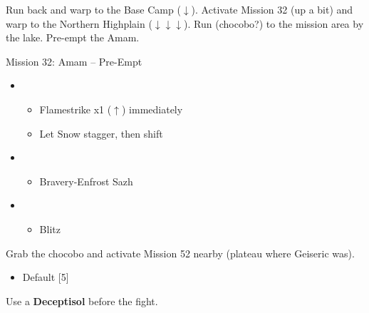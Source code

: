 Run back and warp to the Base Camp ($\downarrow$).
Activate Mission 32 (up a bit) and warp to the Northern Highplain ($\downarrow\downarrow\downarrow$).
Run (chocobo?) to the mission area by the lake.
Pre-empt the Amam.

\begin{battle}{Mission 32: Amam -- Pre-Empt}
	\begin{itemize}
		\item \sixth
			\begin{itemize}
				\item Flamestrike x1 ($\uparrow$) immediately
				\item Let Snow stagger, then shift
			\end{itemize}
		\item \fourth
			\begin{itemize}
				\item Bravery-Enfrost Sazh
			\end{itemize}
		\item \first
			\begin{itemize}
				\item Blitz
			\end{itemize}
	\end{itemize}
\end{battle}

Grab the chocobo and activate Mission 52 nearby (plateau where Geiseric was).

\begin{menu}
	\begin{itemize}
	\paradigm
		\begin{itemize}
			\item Default [5]
		\end{itemize}
	\end{itemize}
\end{menu}

Use a \textbf{Deceptisol} before the fight.

